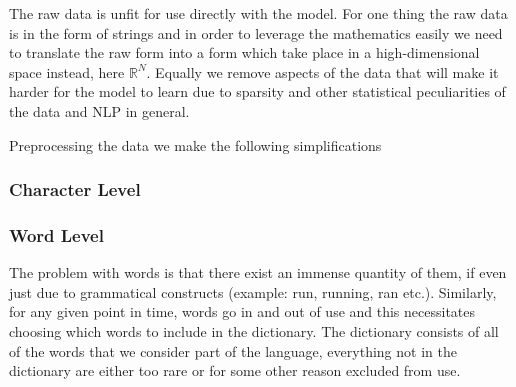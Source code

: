 The raw data is unfit for use directly with the model. For one thing the raw
data is in the form of strings and in order to leverage the mathematics easily
we need to translate the raw form into a form which take place in a
high-dimensional space instead, here $\mathbb{R}^N$. Equally we remove aspects
of the data that will make it harder for the model to learn due to sparsity and
other statistical peculiarities of the data and NLP in general.

Preprocessing the data we make the following simplifications

\subsubsection{Character Level}



\subsubsection{Word Level}

The problem with words is that there exist an immense quantity of them, if even
just due to grammatical constructs (example: run, running, ran etc.). Similarly,
for any given point in time, words go in and out of use and this necessitates
choosing which words to include in the dictionary. The dictionary consists of
all of the words that we consider part of the language, everything not in the
dictionary are either too rare or for some other reason excluded from use.

